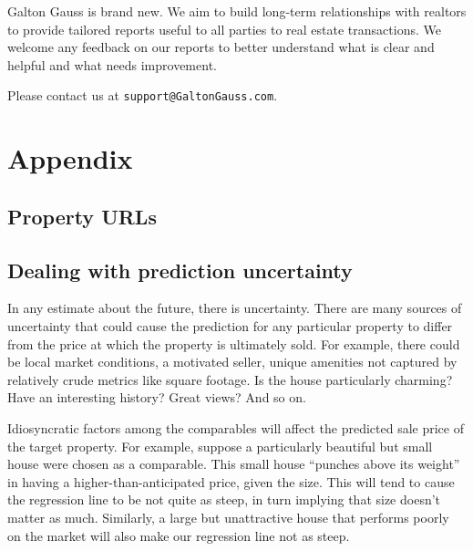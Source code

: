 \documentclass[
12pt, %
letterpaper, %
oneside, %
headinclude,footinclude, %
BCOR5mm, %
]{scrartcl}
\begin{document}
Galton Gauss is brand new. We aim to build long-term relationships with realtors to provide tailored reports useful to all parties to real estate transactions.
We welcome any feedback on our reports to better understand what is clear and helpful and what needs improvement.

Please contact us at \texttt{support@GaltonGauss.com}.


\renewcommand{\refname}{\spacedlowsmallcaps{References}} %


\pagebreak

\appendix

\section{Appendix} 
\subsection{Property URLs} \label{sec:urls}

\begin{itemize}
  
\end{itemize}

\subsection{Dealing with prediction uncertainty}  \label{sec:bootstrapping} 
In any estimate about the future, there is uncertainty.
There are many sources of uncertainty that could cause the prediction for any particular property to differ from the price at which the property is ultimately sold.
For example, there could be local market conditions, a motivated seller, unique amenities not captured by relatively crude metrics like square footage. Is the house particularly charming? Have an interesting history? Great views? And so on. 

Idiosyncratic factors among the comparables will affect the predicted sale price of the target property.
For example, suppose a particularly beautiful but small house were chosen as a comparable.
This small house ``punches above its weight'' in having a higher-than-anticipated price, given the size.
This will tend to cause the regression line to be not quite as steep, in turn implying that size doesn't matter as much.
Similarly, a large but unattractive house that performs poorly on the market will also make our regression line not as steep.
\end{document}

